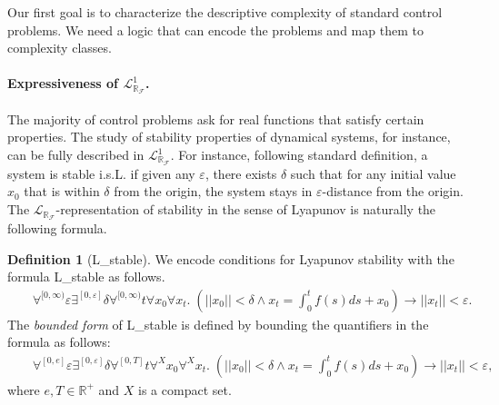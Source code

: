 \documentclass[10pt]{article}
\newcommand{\lrf}{\mathcal{L}_{\mathbb{R}_{\mathcal{F}}}}
\theoremstyle{definition}
\newtheorem{definition}{Definition}
\begin{document}
Our first goal is to characterize the descriptive complexity of standard control problems. We need a logic that can encode the problems and map them to complexity classes. 

\paragraph{Expressiveness of $\lrf^1$.} The majority of control problems ask for real functions that satisfy certain properties. The study of stability properties of dynamical systems, for instance, can be fully described in $\lrf^1$. For instance, following standard definition, a system is stable i.s.L. if given any $\varepsilon$, there exists $\delta$ such that for any initial value $x_0$ that is within $\delta$ from the origin, the system stays in $\varepsilon$-distance from the origin. The $\lrf$-representation of stability in the sense of Lyapunov is naturally the following formula. 
\begin{definition}[{\sf L\_stable}]
We encode conditions for Lyapunov stability with the formula {\sf L\_stable} as follows. 
\begin{eqnarray*}
& &\forall^{[0,\infty)} \varepsilon\exists^{[0,\varepsilon]} \delta \forall^{[0,\infty)} t\forall x_0\forall x_t .\; (||x_0||<\delta \wedge x_t = \int_0^t f(s)ds + x_0 )\rightarrow ||x_t||<\varepsilon.
\end{eqnarray*}
The {\em bounded form} of {\sf L\_stable} is defined by bounding the quantifiers in the formula as follows:
\begin{eqnarray*}
& &\forall^{[0, e]} \varepsilon\exists^{[0,\varepsilon]} \delta \forall^{[0,T]} t\forall^X x_0\forall^X x_t. \;(||x_0||<\delta \wedge x_t = \int_0^t f(s)ds + x_0 )\rightarrow ||x_t||<\varepsilon, 
\end{eqnarray*}
where $e, T\in \mathbb{R}^+$ and $X$ is a compact set.
\end{definition}
\end{document}
